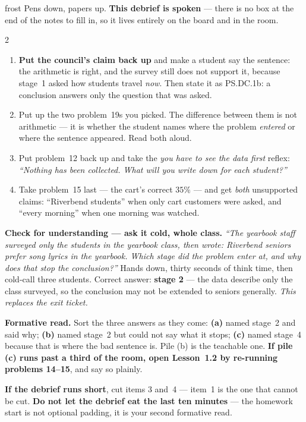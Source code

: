 \documentclass[10pt]{article}
\begin{document}
\boxguard[24]
\begin{skillbox}{frost}
Pens down, papers up. \textbf{This debrief is spoken} --- there is no box at the end of the
notes to fill in, so it lives entirely on the board and in the room.
\begin{multicols}{2}
\begin{enumerate}[leftmargin=1.3em, nosep, itemsep=3pt]
  \item \textbf{Put the council's claim back up} and make a student say the sentence: the
        arithmetic is right, and the survey still does not support it, because stage~1 asked
        how students travel \emph{now}. Then state it as PS.DC.1b: a conclusion answers only
        the question that was asked.
  \item Put up the two problem~19s you picked. The difference between them is not
        arithmetic --- it is whether the student names where the problem \emph{entered} or
        where the sentence appeared. Read both aloud.
  \item Put problem~12 back up and take the \emph{you have to see the data first} reflex:
        \emph{``Nothing has been collected. What will you write down for each student?''}
  \item Take problem~15 last --- the cart's correct $35\%$ --- and get \emph{both} unsupported
        claims: ``Riverbend students'' when only cart customers were asked, and ``every
        morning'' when one morning was watched.
\end{enumerate}
\columnbreak
\textbf{Check for understanding --- ask it cold, whole class.} \emph{``The yearbook staff
surveyed only the students in the yearbook class, then wrote: Riverbend seniors prefer song
lyrics in the yearbook. Which stage did the problem enter at, and why does that stop the
conclusion?''} Hands down, thirty seconds of think time, then cold-call three students.
Correct answer: \textbf{stage 2} --- the data describe only the class surveyed, so the
conclusion may not be extended to seniors generally. \emph{This replaces the exit ticket.}

\textbf{Formative read.} Sort the three answers as they come: \textbf{(a)} named stage~2 and
said why; \textbf{(b)} named stage~2 but could not say what it stops; \textbf{(c)} named
stage~4 because that is where the bad sentence is. Pile (b) is the teachable one. \textbf{If
pile (c) runs past a third of the room, open Lesson~1.2 by re-running problems 14--15}, and
say so plainly.

\textbf{If the debrief runs short}, cut items 3 and~4 --- item~1 is the one that cannot be
cut. \textbf{Do not let the debrief eat the last ten minutes} --- the homework start is not
optional padding, it is your second formative read.
\end{multicols}
\end{skillbox}
\end{document}
